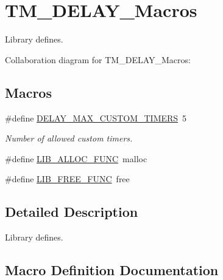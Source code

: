 \hypertarget{group___t_m___d_e_l_a_y___macros}{}\section{T\+M\+\_\+\+D\+E\+L\+A\+Y\+\_\+\+Macros}
\label{group___t_m___d_e_l_a_y___macros}


Library defines.  


Collaboration diagram for T\+M\+\_\+\+D\+E\+L\+A\+Y\+\_\+\+Macros\+:
\subsection*{Macros}
\begin{DoxyCompactItemize}
\item 
\#define \hyperlink{group___t_m___d_e_l_a_y___macros_ga4430f41745879f32d4be22748ba2fbcd}{D\+E\+L\+A\+Y\+\_\+\+M\+A\+X\+\_\+\+C\+U\+S\+T\+O\+M\+\_\+\+T\+I\+M\+E\+RS}~5
\begin{DoxyCompactList}\small\item\em Number of allowed custom timers. \end{DoxyCompactList}\item 
\#define \hyperlink{group___t_m___d_e_l_a_y___macros_ga2f6cdb38a7467b3003737690a87a9e5d}{L\+I\+B\+\_\+\+A\+L\+L\+O\+C\+\_\+\+F\+U\+NC}~malloc
\item 
\#define \hyperlink{group___t_m___d_e_l_a_y___macros_ga23427d671214ac855a2205fcd02c3fc5}{L\+I\+B\+\_\+\+F\+R\+E\+E\+\_\+\+F\+U\+NC}~free
\end{DoxyCompactItemize}


\subsection{Detailed Description}
Library defines. 



\subsection{Macro Definition Documentation}
\mbox{\label{group___t_m___d_e_l_a_y___macros_ga4430f41745879f32d4be22748ba2fbcd}} 
